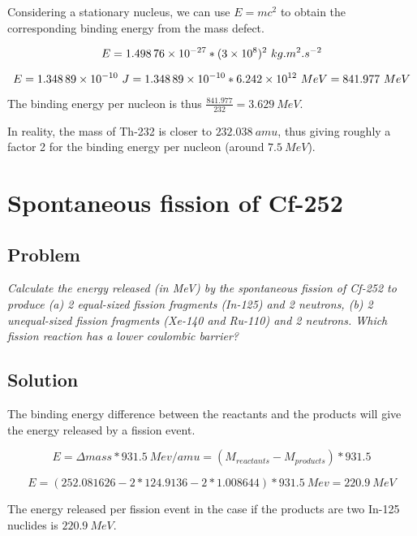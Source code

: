 Considering a stationary nucleus, we can use $E = mc^2$ to obtain the corresponding binding energy from the mass defect.

\begin{equation}
E = \text{\num{1.49876e-27}} * (\text{\num{3e8}})^2\ kg.m^2.s^{-2}
\end{equation}


\begin{equation}
E = \text{\num{1.34889e-10}}\ J = \text{\num{1.34889e-10}} * \text{\num{6.242e12}}\ {MeV} = 841.977\ {MeV}
\end{equation}

The binding energy per nucleon is thus $\frac{841.977}{232} = 3.629\ {MeV}$.

In reality, the mass of Th-232 is closer to $232.038\ amu$, thus giving roughly a factor 2 for the binding energy per nucleon (around $7.5\ MeV$).

\section{Spontaneous fission of Cf-252}
\label{prob12}

\subsection{Problem}
\textit{Calculate the energy released (in MeV) by the spontaneous fission of Cf-252 to produce (a) 2 equal-sized fission fragments (In-125) and 2 neutrons, (b) 2 unequal-sized fission fragments (Xe-140 and Ru-110) and 2 neutrons. Which fission reaction has a lower coulombic barrier?}

\subsection{Solution}

The binding energy difference between the reactants and the products will give the energy released by a fission event.



\begin{equation}
E = \Delta mass * 931.5\ Mev/amu = (M_{reactants} - M_{products}) * 931.5
\end{equation}


\begin{equation}
E = (252.081626 - 2*124.9136 - 2*1.008644) * 931.5\ {Mev} = 220.9\ MeV
\end{equation}

The energy released per fission event in the case if the products are two In-125 nuclides is $220.9\ {MeV}$.


